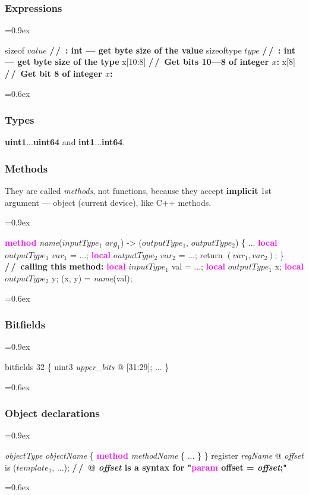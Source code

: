\documentclass[8pt]{extarticle}
\newenvironment{code}[1][]{%
\begin{prebox}[#1]\obeylines%
\fontdimen2\font=0.9ex%
}{%
\end{prebox}%
\fontdimen2\font=0.6ex%
}
\newcommand{\ind}{\hphantom{~~~}}
\newcommand{\kw}[1]{\textcolor{magenta}{\textbf{#1}}}
\newcommand{\ty}[1]{\textcolor{myOrange}{\textbf{#1}}}
\newcommand{\cmtcommon}[1]{\textcolor{Sepia}{\textbf{#1}}}
\newcommand{\cmtd}[1]{\cmtcommon{/\,/\ #1}}
\newcommand{\p}[1]{\textit{\large#1}}
\newcommand{\vshort}[1]{%
\vspace{-0.6em}%
#1%
\vspace{-0.3em}}
\begin{document}
\begin{multicols*}{3}
    \subsubsection{Expressions}
    \begin{code}
        sizeof $value$  \cmtd{: int — get byte size of the value}
        sizeoftype $type$  \cmtd{: int — get byte size of the type}
        x[10:8]  \cmtd{Get bits 10—8 of integer $x$:}
        x[8]  \cmtd{Get bit 8 of integer $x$:}
    \end{code}

    \subsubsection{Types}
    \ty{uint1}...\ty{uint64} and \ty{int1}...\ty{int64}.

    \subsubsection{Methods}
    They are called \textit{methods}, not functions, because
    they accept \textbf{implicit} 1st argument — object (current
    device), like C++ methods.
    \begin{code}
        \kw{method} \p{name}($inputType_1$ $arg_1$) -> ($outputType_1$, $outputType_2$) \{
            \vshort{\ind ...}
            \ind \kw{local} $outputType_1$ $var_1$ = ...; \kw{local} $outputType_2$ $var_2$ = ...;
            \ind return $(var_1, var_2)$;
        \}
        \cmtd{calling this method:}
        \kw{local} $inputType_1$ val = ...;
        \kw{local} $outputType_1$ x; \kw{local} $outputType_2$ y;
        (x, y) = \p{name}(val);
    \end{code}

    \subsubsection{Bitfields}
    \begin{code}
        bitfields 32 \{
            \ind uint3 \p{upper_bits} @ [31:29];
            \vshort{\ind ...}
        \}
    \end{code}

    \subsubsection{Object declarations}
    \begin{code}
        \p{objectType} \p{objectName} \{
            \ind \kw{method} \p{methodName} \{
            \ind     \vshort{\ind \ind ...}
            \ind \}
        \}
        register \p{regName} @ \p{offset} is ($template_1$, ...);
        \cmtd{@ \p{offset} is a syntax for "\kw{param} offset = \p{offset};"}
    \end{code}


\end{multicols*}
\end{document}

